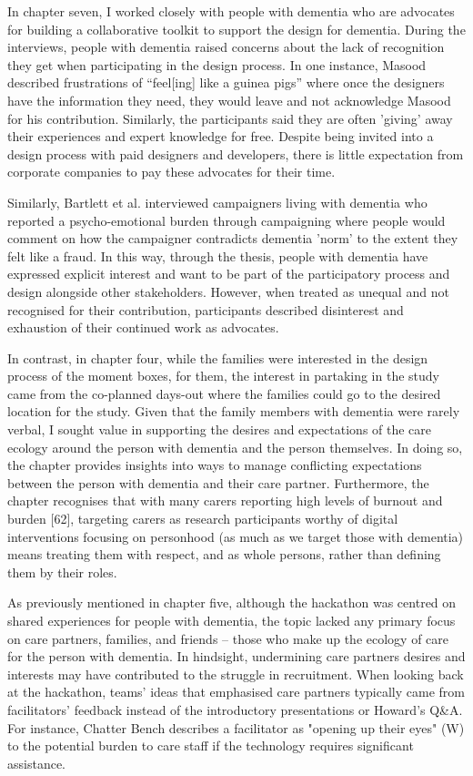 In chapter seven, I worked closely with people with dementia who are advocates for building a collaborative toolkit to support the design for dementia. During the interviews, people with dementia raised concerns about the lack of recognition they get when participating in the design process. In one instance, Masood described frustrations of ``feel[ing] like a guinea pigs'' where once the designers have the information they need, they would leave and not acknowledge Masood for his contribution. Similarly, the participants said they are often 'giving' away their experiences and expert knowledge for free. Despite being invited into a design process with paid designers and developers, there is little expectation from corporate companies to pay these advocates for their time.

Similarly, Bartlett et al. interviewed campaigners living with dementia who reported a psycho-emotional burden through campaigning where people would comment on how the campaigner contradicts dementia 'norm' to the extent they felt like a fraud. In this way, through the thesis, people with dementia have expressed explicit interest and want to be part of the participatory process and design alongside other stakeholders. However, when treated as unequal and not recognised for their contribution, participants described disinterest and exhaustion of their continued work as advocates. 

In contrast, in chapter four, while the families were interested in the design process of the moment boxes, for them, the interest in partaking in the study came from the co-planned days-out where the families could go to the desired location for the study. Given that the family members with dementia were rarely verbal, I sought value in supporting the desires and expectations of the care ecology around the person with dementia and the person themselves. In doing so, the chapter provides insights into ways to manage conflicting expectations between the person with dementia and their care partner. Furthermore, the chapter recognises that with many carers reporting high levels of burnout and burden [62],  targeting carers as research participants worthy of digital interventions focusing on personhood (as much as we target those with dementia) means treating them with respect, and as whole persons, rather than defining them by their roles. 

As previously mentioned in chapter five, although the hackathon was centred on shared experiences for people with dementia, the topic lacked any primary focus on care partners, families, and friends – those who make up the ecology of care for the person with dementia. In hindsight, undermining care partners desires and interests may have contributed to the struggle in recruitment. When looking back at the hackathon, teams' ideas that emphasised care partners typically came from facilitators' feedback instead of the introductory presentations or Howard's Q\&A. For instance, Chatter Bench describes a facilitator as "opening up their eyes" (W) to the potential burden to care staff if the technology requires significant assistance. 

